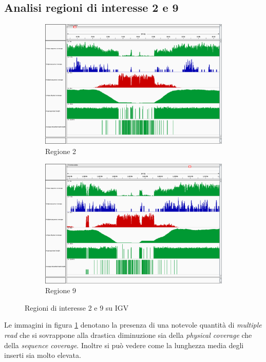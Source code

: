 \subsection{Analisi regioni di interesse 2 e 9}
\begin{figure}[htbp]
	\centering
	\begin{subfigure}[b]{.45\textwidth}
		\includegraphics[width=\textwidth]{immagini/igv_regione2.png}
		\caption{Regione 2}
	\end{subfigure}
	\quad
	\begin{subfigure}[b]{.45\textwidth}
		\includegraphics[width=\textwidth]{immagini/igv_regione9.png}
		\caption{Regione 9}
	\end{subfigure}
\caption{Regioni di interesse 2 e 9 su IGV}
\label{fig:regioni 2 e 9}
\end{figure}

Le immagini in figura \ref{fig:regioni 2 e 9} denotano la presenza di una notevole quantità di \emph{multiple read} che si sovrappone alla drastica diminuzione sia della \emph{physical coverage} che della \emph{sequence coverage}.
Inoltre si può vedere come la lunghezza media degli inserti sia molto elevata.

